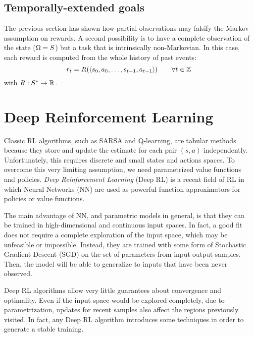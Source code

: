 \subsection{Temporally-extended goals}

The previous section has shown how partial observations may falsify the Markov
assumption on rewards. A second possibility is to have a complete observation
of the state ($\Omega = S$) but a task that is intrinsically
non-Markovian. In this case, each reward is computed from the whole history
of past events:
\begin{equation}
	r_t = R(\langle s_0, a_0, \dots, s_{t-1}, a_{t-1} \rangle) \qquad
	\forall t \in \mathbb{Z}
\end{equation}
with $R: S^* \to \mathbb{R}$.





\section{Deep Reinforcement Learning}

Classic RL algorithms, such as SARSA and Q-learning, are tabular methods
because they store and update the estimate for each pair $(s, a)$
independently. Unfortunately, this requires discrete and small states and
actions spaces. To overcome this very limiting assumption, we need
parametrized value functions and policies.  \emph{Deep Reinforcement Learning}
(Deep RL) is a recent field of RL in which Neural Networks (NN) are used as
powerful function approximators for policies or value functions.

The main advantage of NN, and parametric models in general, is that they can
be trained in high-dimensional and continuous input spaces. In fact, a good
fit does not require a complete exploration of the input space, which may be
unfeasible or impossible. Instead, they are trained with some form of
Stochastic Gradient Descent (SGD) on the set of parameters from input-output
samples. Then, the model will be able to generalize to inputs that have been
never observed.

Deep RL algorithms allow very little guarantees about convergence and
optimality.  Even if the input space would be explored completely, due to
parametrization, updates for recent samples also affect the regions previously
visited. In fact, any Deep RL algorithm introduces some techniques in order to
generate a stable training.

